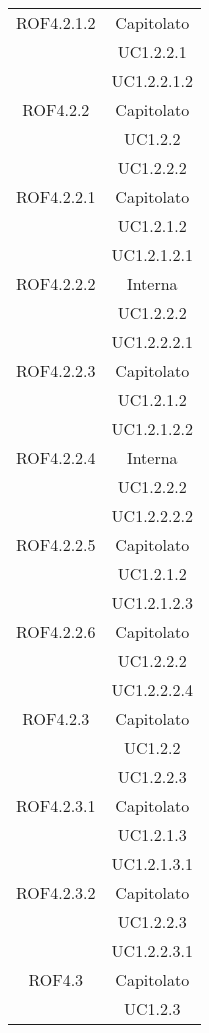 \begin{longtable}{|c|c|}
\midrule
ROF4.2.1.2
& Capitolato\\
& UC1.2.2.1\\
& UC1.2.2.1.2\\

\midrule
ROF4.2.2
& Capitolato\\
& UC1.2.2\\
& UC1.2.2.2\\

\midrule
ROF4.2.2.1
& Capitolato\\
& UC1.2.1.2\\
& UC1.2.1.2.1\\

\midrule
ROF4.2.2.2
& Interna\\
& UC1.2.2.2\\
& UC1.2.2.2.1\\

\midrule
ROF4.2.2.3
& Capitolato\\
& UC1.2.1.2\\
& UC1.2.1.2.2\\

\midrule
ROF4.2.2.4
& Interna\\
& UC1.2.2.2\\
& UC1.2.2.2.2\\

\midrule
ROF4.2.2.5
& Capitolato\\
& UC1.2.1.2\\
& UC1.2.1.2.3\\

\midrule
ROF4.2.2.6
& Capitolato\\
& UC1.2.2.2\\
& UC1.2.2.2.4\\

\midrule
ROF4.2.3
& Capitolato\\
& UC1.2.2\\
& UC1.2.2.3\\

\midrule
ROF4.2.3.1
& Capitolato\\
& UC1.2.1.3\\
& UC1.2.1.3.1\\

\midrule
ROF4.2.3.2
& Capitolato\\
& UC1.2.2.3\\
& UC1.2.2.3.1\\

\midrule
ROF4.3
& Capitolato\\
& UC1.2.3\\


\end{longtable}
